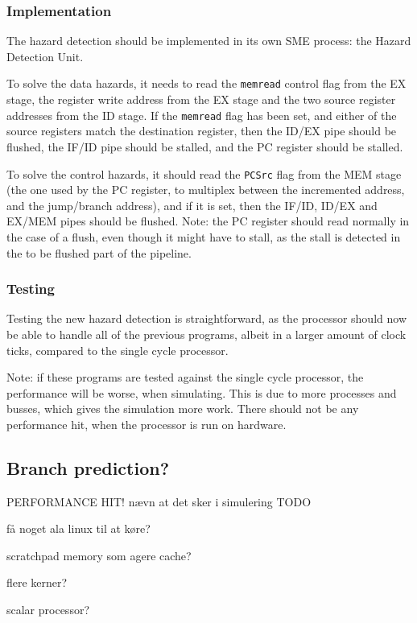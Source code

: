 \subsubsection*{Implementation}
The hazard detection should be implemented in its own SME process: the Hazard
Detection Unit.

To solve the data hazards, it needs to read the \texttt{memread} control flag
from the EX stage, the register write address from the EX stage and the two
source register addresses from the ID stage. If the \texttt{memread} flag has
been set, and either of the source registers match the destination register,
then the ID/EX pipe should be flushed, the IF/ID pipe should be stalled, and
the PC register should be stalled.

To solve the control hazards, it should read the \texttt{PCSrc} flag from the
MEM stage (the one used by the PC register, to multiplex between the
incremented address, and the jump/branch address), and if it is set, then the
IF/ID, ID/EX and EX/MEM pipes should be flushed. Note: the PC register should
read normally in the case of a flush, even though it might have to stall, as
the stall is detected in the to be flushed part of the pipeline.

\subsubsection*{Testing}
Testing the new hazard detection is straightforward, as the processor should
now be able to handle all of the previous programs, albeit in a larger amount
of clock ticks, compared to the single cycle processor.

Note: if these programs are tested against the single cycle processor, the
performance will be worse, when simulating. This is due to more processes and
busses, which gives the simulation more work. There should not be any
performance hit, when the processor is run on hardware.

\subsection{Branch prediction?} PERFORMANCE HIT! nævn at det sker i simulering
TODO

få noget ala linux til at køre?

scratchpad memory som agere cache?

flere kerner?

scalar processor?



